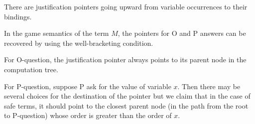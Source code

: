 There are justification pointers going upward from variable
occurrences to their bindings.

In the game semantics of the term $M$, the pointers for O and P
answers can be recovered by using the well-bracketing condition.

For O-question, the justification pointer always points to its
parent node in the computation tree.

For P-question, suppose P ask for the value of variable $x$. Then
there may be several choices for the destination of the pointer but
we claim that in the case of safe terms, it should point to the
closest parent node (in the path from the root to P-question) whose
order is greater than the order of $x$.
